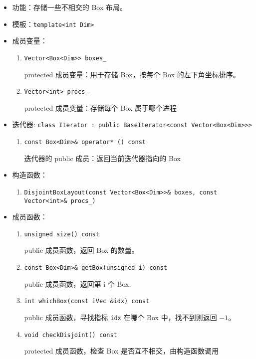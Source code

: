 \documentclass[cn, bibend=bibtex]{elegantpaper}
\theoremstyle{plain}
\begin{document}
\begin{itemize}
  \item 功能：存储一些不相交的 Box 布局。
  \item 模板：\lstinline|template<int Dim>|
  \item 成员变量：
  \begin{enumerate}
    \item \lstinline|Vector<Box<Dim>> boxes_|
    
    protected 成员变量：用于存储 Box，按每个 Box 的左下角坐标排序。

    \item \lstinline|Vector<int> procs_|

    protected 成员变量：存储每个 Box 属于哪个进程
  \end{enumerate}
  \item 迭代器: \lstinline|class Iterator : public BaseIterator<const Vector<Box<Dim>>>|
  \begin{enumerate}
    \item \lstinline|const Box<Dim>& operator* () const|
    
    迭代器的 public 成员：返回当前迭代器指向的 Box
  \end{enumerate}
  \item 构造函数：
  \begin{enumerate}
    \item \lstinline|DisjointBoxLayout(const Vector<Box<Dim>>& boxes, const Vector<int>& procs_)|
  \end{enumerate}
  \item 成员函数：
  \begin{enumerate}
    \item \lstinline|unsigned size() const|

    public 成员函数，返回 Box 的数量。

    \item \lstinline|const Box<Dim>& getBox(unsigned i) const|

    public 成员函数，返回第 i 个 Box.

    \item \lstinline|int whichBox(const iVec &idx) const|

    public 成员函数，寻找指标 \lstinline|idx| 在哪个 Box 中，找不到则返回 $-1$。

    \item \lstinline|void checkDisjoint() const|

    protected 成员函数，检查 Box 是否互不相交，由构造函数调用


\end{enumerate}
\end{itemize}
\end{document}
